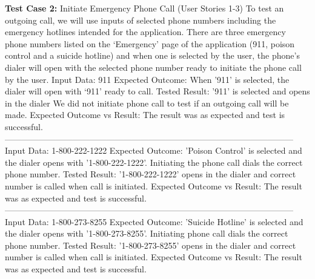 \documentclass[letterpaper,12pt,titlepage]{article}
\begin{document}
\noindent
\textbf{Test Case 2:} Initiate Emergency Phone Call (User Stories 1-3)
\newline
\newline
To test an outgoing call, we will use inputs of selected phone numbers including the emergency hotlines intended for the application. There are three emergency phone numbers listed on the ‘Emergency’ page of the application (911, poison control and a suicide hotline) and when one is selected by the user, the phone’s dialer will open with the selected phone number ready to initiate the phone call by the user.
\newline
\newline
Input Data: 911
\newline
\newline
Expected Outcome: When '911'\cite{911} is selected, the dialer will open with ‘911’ ready to call.
\newline
\newline
Tested Result: '911' is selected and opens in the dialer We did not initiate phone call to test if an outgoing call will be made.
\newline
\newline
Expected Outcome vs Result: The result was as expected and test is successful.
\newline
\newline
------------------------------------------------------------------------------------------------------
\newline
Input Data: 1-800-222-1222
\newline
\newline
Expected Outcome: 'Poison Control'\cite{poison} is selected and the dialer opens with '1-800-222-1222'. Initiating the phone call dials the correct phone number.
\newline
\newline
Tested Result: '1-800-222-1222' opens in the dialer and correct number is called when call is initiated.
\newline
\newline
Expected Outcome vs Result: The result was as expected and test is successful.
\newline
\newline
------------------------------------------------------------------------------------------------------
\newline
Input Data: 1-800-273-8255
\newline
\newline
Expected Outcome: 'Suicide Hotline'\cite{suicide} is selected and the dialer opens with '1-800-273-8255'. Initiating phone call dials the correct phone number.
\newline
\newline
Tested Result: '1-800-273-8255' opens in the dialer and correct number is called when call is initiated.
\newline
\newline
Expected Outcome vs Result: The result was as expected and test is successful.
\newline
\newline
\end{document}
